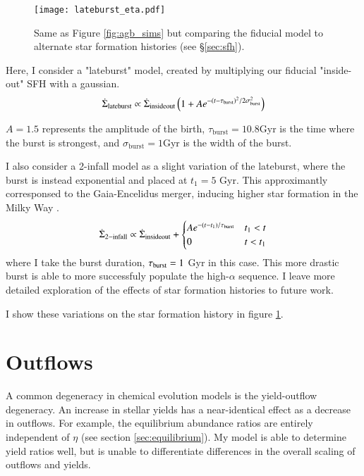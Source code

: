 \documentclass[12pt,oneside]{report}
\begin{document}
\begin{figure}
\centering
\texttt{[image: lateburst\_eta.pdf]}

\caption[Lateburst models]{Same as Figure \ref{fig:agb_sims} but comparing the fiducial model to alternate star formation histories (see \S \ref{sec:sfh}).}
\label{fig:sfh_models}

\end{figure}


Here, I consider a "lateburst" model, created by multiplying our fiducial "inside-out" SFH with a gaussian.
\begin{equation}\label{eq:lateburst}
    \dot{\Sigma}_{\rm lateburst} \propto \dot{\Sigma}_{\rm insideout} \left(1 + A e^{-(t-\tau_{\rm burst})^2/2\sigma^2_{\rm burst}} \right)
\end{equation}

$A=1.5$ represents the amplitude of the birth, $\tau_\text{burst}=10.8$Gyr is the time where the burst is strongest, and $\sigma_\text{burst}=1$Gyr is the width of the burst.

I also consider a 2-infall model as a slight variation of the lateburst, where the burst is instead exponential and placed at $t_1=5$ Gyr. This approximantly corresponsed to the Gaia-Encelidus merger, inducing higher star formation in the Milky Way \citep{bonaca20, helmi18}.
\begin{equation}\label{eq:twoinfall}
    \dot{\Sigma}_{\rm 2-infall} \propto \dot{\Sigma}_{\rm insideout} + 
\begin{cases}
    Ae^{-(t-t_1)/\tau_{\rm burst}} & t_1 < t \\
      0 & t<t_1
\end{cases}
\end{equation}
where I take the burst duration, $\tau_{\rm burst}=1$ Gyr in this case. 
This more drastic burst is able to more successfuly populate the high-$\alpha$ sequence. I leave more detailed exploration of the effects of star formation histories to future work.

I show these variations on the star formation history in figure \ref{fig:sfh_models}.


\section{Outflows} \label{sec:outflows}

A common degeneracy in chemical evolution models is the yield-outflow degeneracy. An increase in stellar yields has a near-identical effect as a decrease in outflows. For example, the equilibrium abundance ratios are entirely independent of $\eta$ (see section \ref{sec:equilibrium}). My model is able to determine yield ratios well, but is unable to differentiate differences in the overall scaling of outflows and yields.
\end{document}
